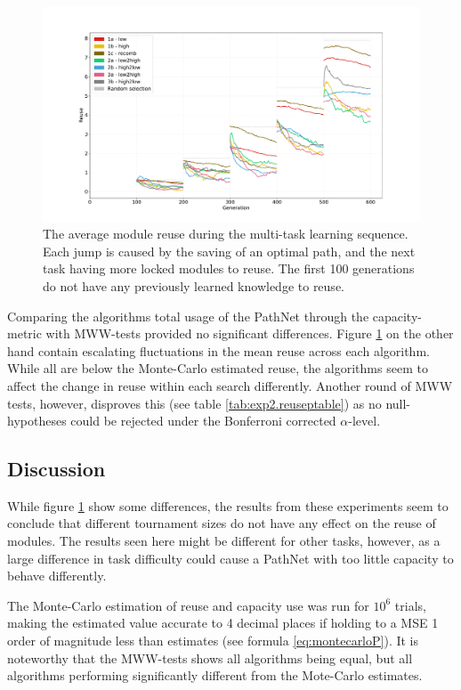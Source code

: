 \begin{figure}
    \includegraphics[width=1.2\textwidth,center]{Chapters/4.Experiments/exp2/figures/inuse/Module_reuse_pr_generation.pdf}
    \caption[Module reuse plot]{The average module reuse during the multi-task learning sequence. Each jump is caused by the saving of an optimal path, and the next task having more locked modules to reuse. The first 100 generations do not have any previously learned knowledge to reuse.}
    \label{fig:search.reuse}
\end{figure}

Comparing the algorithms total usage of the PathNet through the capacity-metric with MWW-tests provided no significant differences. Figure \ref{fig:search.reuse} on the other hand contain escalating fluctuations in the mean reuse across each algorithm. While all are below the Monte-Carlo estimated reuse, the algorithms seem to affect the change in reuse within each search differently. Another round of MWW tests, however, disproves this (see table \ref{tab:exp2.reuseptable}) as no null-hypotheses could be rejected under the Bonferroni corrected \(\alpha\)-level.

\subsection{Discussion}
While figure \ref{fig:search.reuse} show some differences, the results from these experiments seem to conclude that different tournament sizes do not have any effect on the reuse of modules. The results seen here might be different for other tasks, however, as a large difference in task difficulty could cause a PathNet with too little capacity to behave differently.

The Monte-Carlo estimation of reuse and capacity use was run for \(10^{6}\) trials, making the estimated value accurate to 4 decimal places if holding to a MSE 1 order of magnitude less than estimates (see formula \ref{eq:montecarloP}). It is noteworthy that the MWW-tests shows all algorithms being equal, but all algorithms performing significantly different from the Mote-Carlo estimates. 

